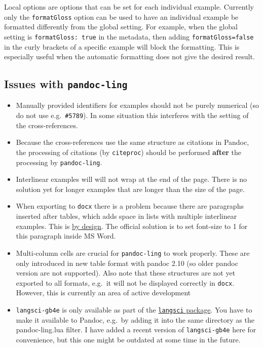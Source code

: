 \documentclass[
]{article}
\providecommand{\tightlist}{%
  \setlength{\itemsep}{0pt}\setlength{\parskip}{0pt}}
\begin{document}
Local options are options that can be set for each individual example.
Currently only the \texttt{formatGloss} option can be used to have an
individual example be formatted differently from the global setting. For
example, when the global setting is \texttt{formatGloss:\ true} in the
metadata, then adding \texttt{formatGloss=false} in the curly brackets
of a specific example will block the formatting. This is especially
useful when the automatic formatting does not give the desired result.

\hypertarget{issues-with-pandoc-ling}{%
\subsection{\texorpdfstring{Issues with
\texttt{pandoc-ling}}{Issues with pandoc-ling}}\label{issues-with-pandoc-ling}}

\begin{itemize}
\tightlist
\item
  Manually provided identifiers for examples should not be purely
  numerical (so do not use e.g.~\texttt{\#5789}). In some situation this
  interferes with the setting of the cross-references.
\item
  Because the cross-references use the same structure as citations in
  Pandoc, the processing of citations (by \texttt{citeproc}) should be
  performed \textbf{after} the processing by \texttt{pandoc-ling}.
\item
  Interlinear examples will will not wrap at the end of the page. There
  is no solution yet for longer examples that are longer than the size
  of the page.
\item
  When exporting to \texttt{docx} there is a problem because there are
  paragraphs inserted after tables, which adds space in lists with
  multiple interlinear examples. This is
  \href{https://answers.microsoft.com/en-us/msoffice/forum/msoffice_word-mso_windows8-mso_2013_release/how-to-remove-extra-paragraph-after-table/995b3811-9f55-4df1-bbbc-9f672b1ad262}{by
  design}. The official solution is to set font-size to 1 for this
  paragraph inside MS Word.
\item
  Multi-column cells are crucial for \texttt{pandoc-ling} to work
  properly. These are only introduced in new table format with pandoc
  2.10 (so older pandoc version are not supported). Also note that these
  structures are not yet exported to all formats, e.g.~it will not be
  displayed correctly in \texttt{docx}. However, this is currently an
  area of active development
\item
  \texttt{langsci-gb4e} is only available as part of the
  \href{https://ctan.org/pkg/langsci?lang=en}{\texttt{langsci} package}.
  You have to make it available to Pandoc, e.g.~by adding it into the
  same directory as the pandoc-ling.lua filter. I have added a recent
  version of \texttt{langsci-gb4e} here for convenience, but this one
  might be outdated at some time in the future.
\end{itemize}
\end{document}
